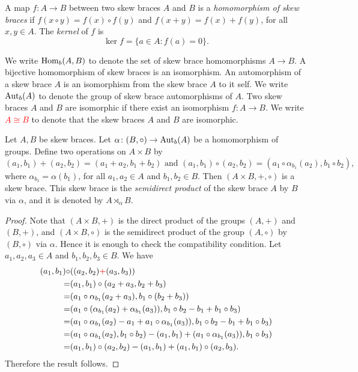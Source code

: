  \begin{definition}
 	A map $f\colon A\to B$ between two skew braces $A$ and $B$ is a {\em homomorphism of skew braces} if $f(x\circ y)=f(x)\circ f(y)$ and $f(x+y)=f(x)+f(y)$, for all $x,y\in A$.  The \emph{kernel} of $f$ is
     \[
         \ker f=\{a\in A:f(a)=0\}.
     \]
 \end{definition}

We write $\operatorname{Hom}_b(A,B)$ to denote the set
of skew brace homomorphisms $A\to B$.
A bijective homomorphism of skew braces is an isomorphism. An automorphism of a skew brace $A$ is an isomorphism from the skew brace $A$ to it self. 
We write $\operatorname{Aut}_b(A)$ to denote the group of skew brace 
automorphisms of $A$.
Two skew braces $A$ and $B$ are isomorphic if there exist an isomorphism $f\colon A\rightarrow B$. We write \textcolor{red}{$A\cong B$} to denote that the skew braces $A$ and $B$ are isomorphic.

\begin{proposition}
\label{prop:semidirect} 
 Let $A,B$ be skew braces. Let $\alpha\colon (B,\circ)\rightarrow \operatorname{Aut}_b(A)$ be a homomorphism of groups. Define two operations on $A\times B$ by
\[ (a_1,b_1)+(a_2,b_2)=(a_1+a_2,b_1+b_2)\text{ and }(a_1,b_1)\circ (a_2,b_2)=(a_1\circ\alpha_{b_1}(a_2),b_1\circ b_2),\]
where $\alpha_{b_1}=\alpha(b_1)$, for all $a_1,a_2\in A$ and $b_1,b_2\in B$. Then $(A\times B,+,\circ)$ is a skew brace. This skew brace is the {\em semidirect product} of the skew brace $A$ by $B$ via $\alpha$, and it is denoted by $A\rtimes_{\alpha}B$.
\end{proposition}

\begin{proof}
    Note that $(A\times B,+)$ is the direct product of the groups $(A,+)$ and $(B,+)$, and $(A\times B,\circ)$ is the semidirect product of the group $(A,\circ)$ by $(B,\circ)$ via $\alpha$. Hence it is enough to check the compatibility condition.
    Let $a_1,a_2,a_3\in A$ and $b_1,b_2,b_3\in B$. We have
    \begin{align*}
        (a_1,b_1)\circ &((a_2,b_2)\textcolor{red}{+}(a_3,b_3))\\
        =&(a_1,b_1)\circ (a_2+a_3,b_2+b_3)\\
        =&(a_1\circ \alpha_{b_1}(a_2+a_3),b_1\circ (b_2+b_3))\\
        =&(a_1\circ (\alpha_{b_1}(a_2)+\alpha_{b_1}(a_3)),b_1\circ b_2-b_1+b_1\circ b_3)\\
        =&(a_1\circ \alpha_{b_1}(a_2)-a_1+a_1\circ\alpha_{b_1}(a_3)),b_1\circ b_2-b_1+b_1\circ b_3)\\
        =&(a_1\circ \alpha_{b_1}(a_2),b_1\circ b_2)-(a_1,b_1)+(a_1\circ\alpha_{b_1}(a_3)),b_1\circ b_3)\\
        =&(a_1,b_1)\circ (a_2,b_2)-(a_1,b_1)+(a_1,b_1)\circ (a_2,b_3).
    \end{align*}
Therefore the result follows.
\end{proof}

